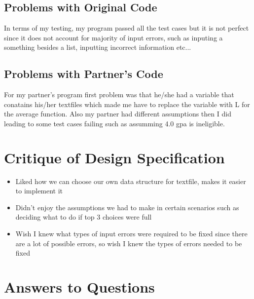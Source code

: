 \documentclass[12pt]{article}
\begin{document}
\subsection{Problems with Original Code}

In terms of my testing, my program passed all the test cases but it is not perfect since it does not account for majority of input errors, such as inputing a something besides a list, inputting incorrect information etc...

\subsection{Problems with Partner's Code}

For my partner's program first problem was that he/she had a variable that conatains his/her textfiles which made me have to replace the variable with L for the average function. Also my partner had different assumptions then I did leading to some test cases failing such as assumming 4.0 gpa is ineligible.
\section{Critique of Design Specification}

\begin{itemize}
  \item Liked how we can choose our own data structure for textfile, makes it easier to implement it
  \item Didn't enjoy the assumptions we had to make in certain scenarios such as deciding what to do if top 3 choices were full
  \item Wish I knew what types of input errors were required to be fixed since there are a lot of possible errors, so wish I knew the types of errors needed to be fixed
  

\end{itemize}



\section{Answers to Questions}
\end{document}
